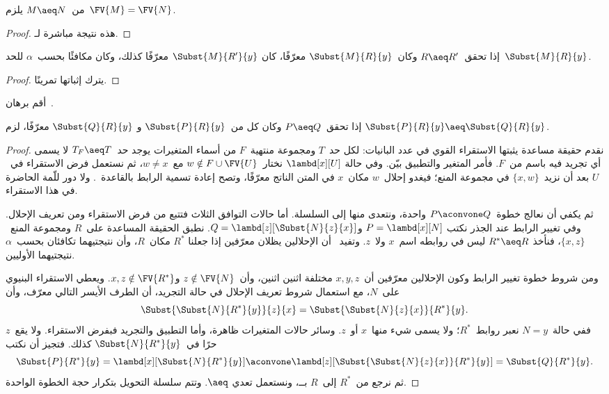 \documentclass[../../../include/open-logic-section]{subfiles}
\begin{document}
\begin{thm}
  من~$M \aeq N$ يلزم~$\FV{M} = \FV{N}$.
\end{thm}

\begin{proof}
  هذه نتيجة مباشرة لـ.
\end{proof}

\begin{lem}
  إذا تحقق~$R \aeq R'$ وكان~$\Subst{M}{R}{y}$ معرّفًا، كان
  $\Subst{M}{R'}{y}$ معرّفًا كذلك، وكان مكافئًا بحسب~$\alpha$ للحد~$\Subst{M}{R}{y}$.
\end{lem}

\begin{proof}
  يترك إثباتها تمرينًا.
\end{proof}

\begin{prob}
  أقم برهان~.
\end{prob}

\begin{lem}
  إذا تحقق~$P\aeq Q$ وكان كل من~$\Subst{P}{R}{y}$ و
  $\Subst{Q}{R}{y}$ معرّفًا، لزم
  $\Subst{P}{R}{y}\aeq\Subst{Q}{R}{y}$.
\end{lem}

\begin{proof}
  نقدم حقيقة مساعدة يثبتها الاستقراء القوي في عدد البانيات: لكل حد~$T$
  ومجموعة منتهية~$F$ من أسماء المتغيرات يوجد حد~$T_F\aeq T$ لا يسمى أي
  تجريد فيه باسم من~$F$. فأمر المتغير والتطبيق بيّن. وفي حالة
  $\lambd[x][U]$ نختار~$w\notin F\cup\FV{U}$ مع~$w\ne x$، ثم نستعمل
  فرض الاستقراء في~$U$ بعد أن نزيد~$\{x,w\}$ في مجموعة المنع؛ فيغدو
  إحلال~$w$ مكان~$x$ في المتن الناتج معرّفًا، وتصح إعادة تسمية الرابط
  بالقاعدة~. ولا دور للّمة الحاضرة في هذا
  الاستقراء.

  ثم يكفي أن نعالج خطوة~$P\aconvone Q$ واحدة، ونتعدى منها إلى السلسلة.
  أما حالات التوافق الثلاث فتتبع من فرض الاستقراء ومن تعريف الإحلال.
  وفي تغيير الرابط عند الجذر نكتب
  $P=\lambd[x][N]$ و$Q=\lambd[z][\Subst{N}{z}{x}]$.
  نطبق الحقيقة المساعدة على~$R$ ومجموعة المنع~$\{x,z\}$، فنأخذ
  $R^\ast\aeq R$ ليس في روابطه اسم~$x$ ولا~$z$.
  وتفيد~ أن الإحلالين يظلان معرّفين إذا جعلنا
  $R^\ast$ مكان~$R$، وأن نتيجتيهما تكافئان بحسب~$\alpha$ نتيجتيهما
  الأوليين.

  ومن شروط خطوة تغيير الرابط وكون الإحلالين معرّفين أن~$x,y,z$ مختلفة
  اثنين اثنين، وأن~$z\notin\FV{N}$ و$x,z\notin\FV{R^\ast}$.
  ويعطي الاستقراء البنيوي على~$N$، مع استعمال شروط تعريف الإحلال في
  حالة التجريد، أن الطرف الأيسر التالي معرّف، وأن
  \[
    \Subst{\Subst{N}{R^\ast}{y}}{z}{x}
    =\Subst{\Subst{N}{z}{x}}{R^\ast}{y}.
  \]
  ففي حالة~$N=y$ نعبر روابط~$R^\ast$؛ ولا يسمى شيء منها~$x$ أو~$z$.
  وسائر حالات المتغيرات ظاهرة، وأما التطبيق والتجريد فبفرض الاستقراء.
  ولا يقع~$z$ حرًا في~$\Subst{N}{R^\ast}{y}$ كذلك. فتجيز
   أن نكتب
  \[
    \Subst{P}{R^\ast}{y}
    =\lambd[x][\Subst{N}{R^\ast}{y}]
    \aconvone
    \lambd[z][\Subst{\Subst{N}{z}{x}}{R^\ast}{y}]
    =\Subst{Q}{R^\ast}{y}.
  \]
  ثم نرجع من~$R^\ast$ إلى~$R$ بــ، ونستعمل تعدي
  $\aeq$. وتتم سلسلة التحويل بتكرار حجة الخطوة الواحدة.
\end{proof}
\end{document}
